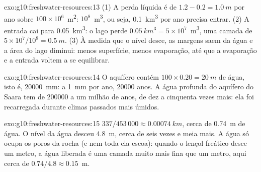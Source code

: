 \begin{solution}{exo:g10:freshwater-resources:13}
(1) A perda líquida é de $1.2 - 0.2 = \qty{1.0}{m}$ por ano sobre
$100 \times 10^6$~\unit{m^2}: $10^8$~\unit{m^3}, ou seja, \qty{0.1}{km^3}
por ano precisa entrar. (2) A entrada cai para \qty{0.05}{km^3}: o lago
perde $\qty{0.05}{km^3} = 5 \times 10^7$~\unit{m^3}, uma camada de
$5 \times 10^7/10^8 = \qty{0.5}{m}$. (3) À medida que o nível desce, as
margens saem da água e a área do lago diminui: menos superfície, menos
evaporação, até que a evaporação e a entrada voltem a se equilibrar.
\end{solution}

\begin{solution}{exo:g10:freshwater-resources:14}
O aquífero contém $100 \times 0.20 = \qty{20}{m}$ de água, isto é,
\qty{20000}{mm}: a \qty{1}{mm} por ano, \num{20000} anos. A água profunda do
aquífero do Saara tem de \num{200000} a um milhão de anos, de dez a
cinquenta vezes mais: ela foi recarregada durante climas passados mais
úmidos.
\end{solution}

\begin{solution}{exo:g10:freshwater-resources:15}
$337/453\,000 \approx \qty{0.00074}{km}$, cerca de \qty{0.74}{m} de água. O
nível da água desceu \qty{4.8}{m}, cerca de seis vezes e meia mais. A água
só ocupa os poros da rocha (e nem toda ela escoa): quando o lençol freático
desce um metro, a água liberada é uma camada muito mais fina que um metro,
aqui cerca de $0.74/4.8 \approx \num{0.15}$~m.
\end{solution}

